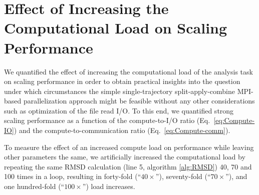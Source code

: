 
\section{Effect of Increasing the Computational Load on Scaling
  Performance}
\label{sec:shiftload}

We quantified the effect of increasing the computational load of the analysis task on scaling performance in order to obtain practical insights into the question under which circumstances the simple single-trajectory split-apply-combine MPI-based parallelization approach might be feasible without any other considerations such as optimization of the file read I/O.
To this end, we quantified strong scaling performance as a function of the compute-to-I/O ratio \RcompIO (Eq.~\ref{eq:Compute-IO}) and the compute-to-communication ratio \Rcompcomm (Eq.~\ref{eq:Compute-comm}).

To measure the effect of an increased compute load on performance while leaving other parameters the same, we artificially increased the computational load by repeating the same RMSD calculation (line 5, algorithm \ref{alg:RMSD}) 40, 70 and 100 times in a loop, resulting in forty-fold (``$40\times$''), seventy-fold (``$70\times$''), and one hundred-fold (``$100\times$'') load increases.





